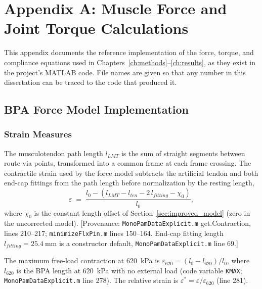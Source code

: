 \chapter{Appendix A: Muscle Force and Joint Torque Calculations}\label{app:muscle_calcs}
\graphicspath{{figs/AppendixA/}}

This appendix documents the reference implementation of the force, torque, and compliance equations used in Chapters~\ref{ch:methods}--\ref{ch:results}, as they exist in the project's MATLAB code. File names are given so that any number in this dissertation can be traced to the code that produced it.

\section{BPA Force Model Implementation}

\subsection{Strain Measures}
The musculotendon path length $l_{LMT}$ is the sum of straight segments between route via points, transformed into a common frame at each frame crossing. The contractile strain used by the force model subtracts the artificial tendon and both end-cap fittings from the path length before normalization by the resting length,
\begin{equation}
    \varepsilon \;=\; \frac{l_{0} - \left(l_{LMT} - l_{ten} - 2\,l_{fitting} - \chi_{0}\right)}{l_{0}},
    \label{eq:app_strain}
\end{equation}
where $\chi_{0}$ is the constant length offset of Section~\ref{sec:improved_model} (zero in the uncorrected model). [Provenance: \texttt{MonoPamDataExplicit.m} get.Contraction, lines 210--217; \texttt{minimizeFlxPin.m} lines 150--164. End-cap fitting length $l_{fitting}=\qty{25.4}{\mm}$ is a constructor default, \texttt{MonoPamDataExplicit.m} line 69.]

The maximum free-load contraction at \qty{620}{\kPa} is $\varepsilon_{620} = (l_{0}-l_{620})/l_{0}$, where $l_{620}$ is the BPA length at \qty{620}{\kPa} with no external load (code variable \texttt{KMAX}; \texttt{MonoPamDataExplicit.m} line 278). The relative strain is $\varepsilon^{*} = \varepsilon / \varepsilon_{620}$ (line 281).

